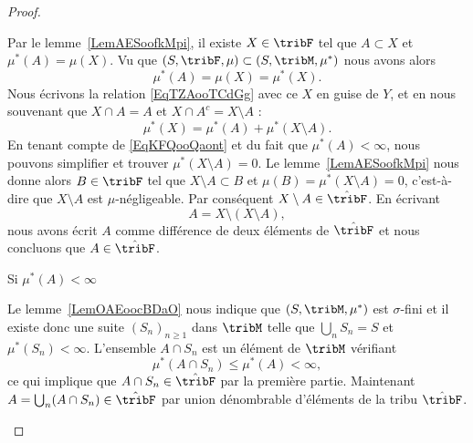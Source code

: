 \begin{proof}
\begin{subproof}
        Par le lemme~\ref{LemAESoofkMpi}, il existe \( X\in\tribF\) tel que \( A\subset X\) et \( \mu^*(A)=\mu(X)\). Vu que \( (S,\tribF,\mu)\subset (S,\tribM,\mu^*)\) nous avons alors
        \begin{equation}    \label{EqKFQooQaont}
            \mu^*(A)=\mu(X)=\mu^*(X).
        \end{equation}
        Nous écrivons la relation \eqref{EqTZAooTCdGg} avec ce \( X\) en guise de \( Y\), et en nous souvenant que \( X\cap A=A\) et \( X\cap A^c=X\setminus A\) :
        \begin{equation}
            \mu^*(X)=\mu^*(A)+\mu^*(X\setminus A).
        \end{equation}
        En tenant compte de \eqref{EqKFQooQaont} et du fait que \( \mu^*(A)<\infty\), nous pouvons simplifier et trouver \( \mu^*(X\setminus A)=0\). Le lemme~\ref{LemAESoofkMpi} nous donne alors \( B\in\tribF\) tel que \( X\setminus A\subset B\) et \( \mu(B)=\mu^*(X\setminus A)=0\), c'est-à-dire que \( X\setminus A\) est \( \mu\)-négligeable. Par conséquent \( X\setminus A\in\hat\tribF\). En écrivant
        \begin{equation}
            A=X\setminus(X\setminus A),
        \end{equation}
        nous avons écrit \( A\) comme différence de deux éléments de \( \hat\tribF\) et nous concluons que \( A\in\hat\tribF\).

        \item[Si \( \mu^*(A)<\infty\)]

            Le lemme~\ref{LemOAEoocBDaO} nous indique que \( (S,\tribM,\mu^*)\) est \( \sigma\)-fini et il existe donc une suite \( (S_n)_{n\geq 1}\) dans \( \tribM\) telle que \( \bigcup_nS_n=S\) et \( \mu^*(S_n)<\infty\). L'ensemble \( A\cap S_n\) est un élément de \( \tribM\) vérifiant
            \begin{equation}
                \mu^*(A\cap S_n)\leq \mu^*(A)<\infty,
            \end{equation}
            ce qui implique que \( A\cap S_n\in\hat\tribF\) par la première partie. Maintenant \( A=\bigcup_n(A\cap S_n)\in\hat\tribF\) par union dénombrable d'éléments de la tribu \( \hat\tribF\).
    \end{subproof}
\end{proof}


